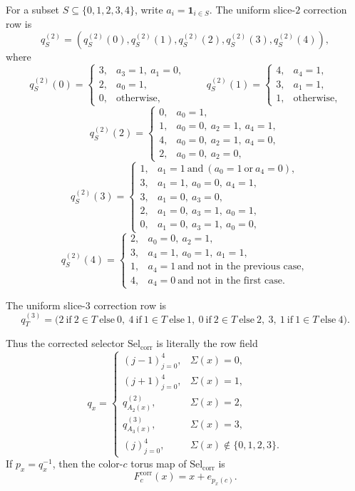 \documentclass[11pt]{article}
\newcommand{\SelCorr}{\mathrm{Sel}_{\mathrm{corr}}}
\begin{document}
For a subset \(S\subseteq\{0,1,2,3,4\}\), write \(a_i=\mathbf 1_{i\in S}\).
The uniform slice-\(2\) correction row is
\[
q^{(2)}_S=(q^{(2)}_S(0),q^{(2)}_S(1),q^{(2)}_S(2),q^{(2)}_S(3),q^{(2)}_S(4)),
\]
where
\[
q^{(2)}_S(0)=
\begin{cases}
3,& a_3=1,\ a_1=0,\\
2,& a_0=1,\\
0,& \text{otherwise,}
\end{cases}
\qquad
q^{(2)}_S(1)=
\begin{cases}
4,& a_4=1,\\
3,& a_1=1,\\
1,& \text{otherwise,}
\end{cases}
\]
\[
q^{(2)}_S(2)=
\begin{cases}
0,& a_0=1,\\
1,& a_0=0,\ a_2=1,\ a_4=1,\\
4,& a_0=0,\ a_2=1,\ a_4=0,\\
2,& a_0=0,\ a_2=0,
\end{cases}
\]
\[
q^{(2)}_S(3)=
\begin{cases}
1,& a_1=1\ \text{and}\ (a_0=1\ \text{or}\ a_4=0),\\
3,& a_1=1,\ a_0=0,\ a_4=1,\\
3,& a_1=0,\ a_3=0,\\
2,& a_1=0,\ a_3=1,\ a_0=1,\\
0,& a_1=0,\ a_3=1,\ a_0=0,
\end{cases}
\]
\[
q^{(2)}_S(4)=
\begin{cases}
2,& a_0=0,\ a_2=1,\\
3,& a_4=1,\ a_0=1,\ a_1=1,\\
1,& a_4=1\ \text{and not in the previous case},\\
4,& a_4=0\ \text{and not in the first case}.
\end{cases}
\]

The uniform slice-\(3\) correction row is
\[
q^{(3)}_T=
\bigl(
2\ \text{if}\ 2\in T\ \text{else}\ 0,\ 
4\ \text{if}\ 1\in T\ \text{else}\ 1,\ 
0\ \text{if}\ 2\in T\ \text{else}\ 2,\ 
3,\ 
1\ \text{if}\ 1\in T\ \text{else}\ 4
\bigr).
\]

Thus the corrected selector \(\SelCorr\) is literally the row field
\[
q_x=
\begin{cases}
(j-1)_{j=0}^4, & \Sigma(x)=0,\\
(j+1)_{j=0}^4, & \Sigma(x)=1,\\
q^{(2)}_{A_2(x)}, & \Sigma(x)=2,\\
q^{(3)}_{A_3(x)}, & \Sigma(x)=3,\\
(j)_{j=0}^4, & \Sigma(x)\notin\{0,1,2,3\}.
\end{cases}
\]
If \(p_x=q_x^{-1}\), then the color-\(c\) torus map of \(\SelCorr\) is
\[
F_c^{\mathrm{corr}}(x)=x+e_{p_x(c)}.
\]
\end{document}
